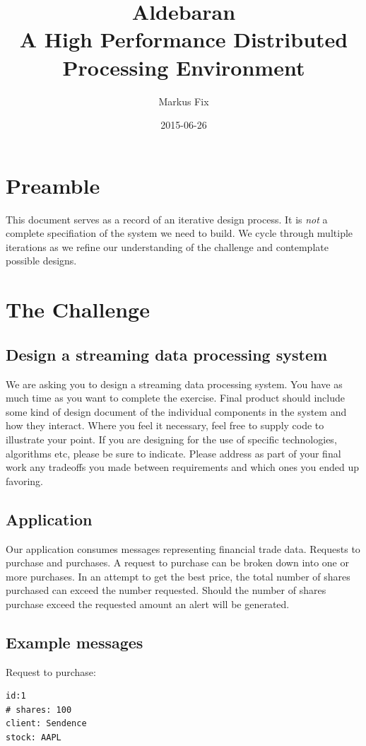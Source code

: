 \documentclass[captions=tableheading]{scrreprt}
\title{}
\author{Markus Fix}
\date{2015-06-26}
\title{Aldebaran \\ A High Performance Distributed Processing Environment}
\begin{document}
\maketitle
\tableofcontents

\listoffigures

\chapter{Preamble}
\label{sec:orgheadline1}
This document serves as a record of an iterative design process. It is
\emph{not} a complete specifiation of the system we need to build. We cycle
through multiple iterations as we refine our understanding of the
challenge and contemplate possible designs.

\chapter{The Challenge}
\label{sec:orgheadline8}
\section{Design a streaming data processing system}
\label{sec:orgheadline2}
We are asking you to design a streaming data processing system. You
have as much time as you want to complete the exercise. Final product
should include some kind of design document of the individual
components in the system and how they interact. Where you feel it
necessary, feel free to supply code to illustrate your point. If you
are designing for the use of specific technologies, algorithms etc,
please be sure to indicate. Please address as part of your final work
any tradeoffs you made between requirements and which ones you ended
up favoring.

\section{Application}
\label{sec:orgheadline3}
Our application consumes messages representing financial trade data.
Requests to purchase and purchases. A request to purchase can be
broken down into one or more purchases. In an attempt to get the best
price, the total number of shares purchased can exceed the number
requested. Should the number of shares purchase exceed the requested
amount an alert will be generated.

\section{Example messages}
\label{sec:orgheadline4}
Request to purchase:
\begin{verbatim}
id:1
# shares: 100
client: Sendence
stock: AAPL
\end{verbatim}
\end{document}
